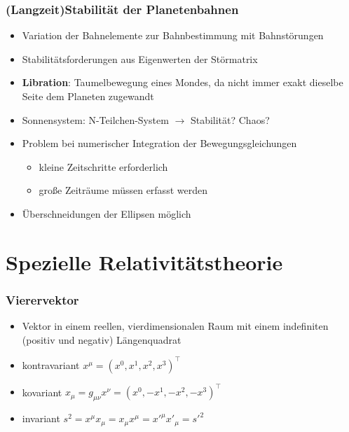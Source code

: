 \documentclass{beamer}
\begin{document}
\begin{frame}\frametitle{(Langzeit)Stabilität der Planetenbahnen}

\begin{itemize}
\item Variation der Bahnelemente zur Bahnbestimmung mit Bahnstörungen
\item Stabilitätsforderungen aus Eigenwerten der Störmatrix
\item \textbf{Libration}: Taumelbewegung eines Mondes, da nicht immer exakt dieselbe Seite dem Planeten zugewandt
\item Sonnensystem: N-Teilchen-System  $\to$ Stabilität? Chaos?
\item Problem bei numerischer Integration der Bewegungsgleichungen
\begin{itemize}
\item kleine Zeitschritte erforderlich
\item große Zeiträume müssen erfasst werden
\end{itemize}
\item Überschneidungen der Ellipsen möglich
\end{itemize}

\end{frame}

\section{Spezielle Relativitätstheorie}

\begin{frame}\frametitle{Vierervektor}

\begin{itemize}
\item Vektor in einem reellen, vierdimensionalen Raum mit einem indefiniten (positiv und negativ) Längenquadrat\\[.3cm]
\item kontravariant \quad $x^{\mu} = (x^0,x^1,x^2,x^3)^\intercal$
\item kovariant \quad $x_{\mu} = g_{\mu \nu} x^{\nu} = (x^0,-x^1,-x^2,-x^3)^\intercal$
\item invariant \quad $s^2 = x^{\mu}x_{\mu} = x_{\mu}x^{\mu} = x'^{\mu}x'_{\mu} = s'^2$
\end{itemize}

\end{frame}
\end{document}
